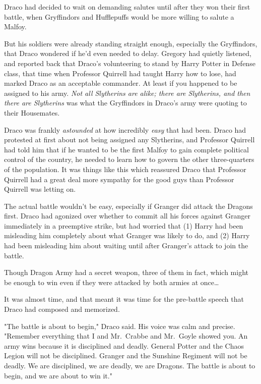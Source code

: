 Draco had decided to wait on demanding salutes until after they won their first 
battle, when Gryffindors and Hufflepuffs would be more willing to salute a 
Malfoy.

But his soldiers were already standing straight enough, especially the 
Gryffindors, that Draco wondered if he'd even needed to delay. Gregory had 
quietly listened, and reported back that Draco's volunteering to stand by Harry 
Potter in Defense class, that time when Professor Quirrell had taught Harry how 
to lose, had marked Draco as an acceptable commander. At least if you happened 
to be assigned to his army. \emph{Not all Slytherins are alike; there are 
Slytherins, and then there are Slytherins} was what the Gryffindors in Draco's 
army were quoting to their Housemates.

Draco was frankly \emph{astounded} at how incredibly \emph{easy} that had been. 
Draco had protested at first about not being assigned any Slytherins, and 
Professor Quirrell had told him that if he wanted to be the first Malfoy to 
gain complete political control of the country, he needed to learn how to 
govern the other three-quarters of the population. It was things like this 
which reassured Draco that Professor Quirrell had a great deal more sympathy 
for the good guys than Professor Quirrell was letting on.

The actual battle wouldn't be easy, especially if Granger did attack the 
Dragons first. Draco had agonized over whether to commit all his forces against 
Granger immediately in a preemptive strike, but had worried that (1) Harry had 
been misleading him completely about what Granger was likely to do, and (2) 
Harry had been misleading him about waiting until after Granger's attack to 
join the battle.

Though Dragon Army had a secret weapon, three of them in fact, which might be 
enough to win even if they were attacked by both armies at once{\ldots}

It was almost time, and that meant it was time for the pre-battle speech that 
Draco had composed and memorized.

"The battle is about to begin," Draco said. His voice was calm and precise. 
"Remember everything that I and Mr.~Crabbe and Mr.~Goyle showed you. An army 
wins because it is disciplined and deadly. General Potter and the Chaos Legion 
will not be disciplined. Granger and the Sunshine Regiment will not be deadly. 
We are disciplined, we are deadly, we are Dragons. The battle is about to 
begin, and we are about to win it."
\sbreak
